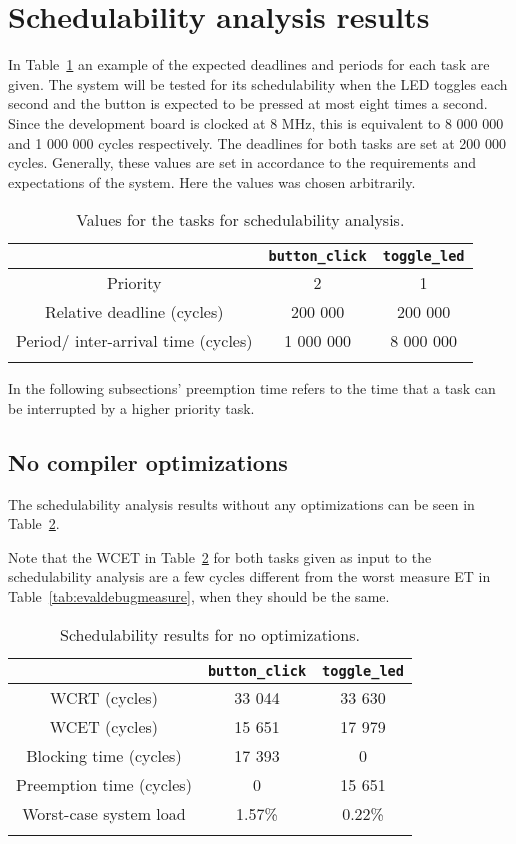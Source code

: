 \section{Schedulability analysis results}
In Table~\ref{tab:evalschedtasks} an example of the expected deadlines and
periods for each task are given. The system will be tested for its
schedulability when the LED toggles each second and the button is expected to
be pressed at most eight times a second. Since the development board is clocked
at 8 MHz, this is equivalent to 8 000 000 and 1 000 000 cycles respectively. The
deadlines for both tasks are set at 200 000 cycles. Generally, these values are set
in accordance to the requirements and expectations of the system. Here the values
was chosen arbitrarily.

\begin{longtable}{|c | c | c|}
    \hline
     & \texttt{button\_click} & \texttt{toggle\_led} \\
    \hline
    Priority & 2 & 1 \\
    \hline
    Relative deadline (cycles) & 200 000 & 200 000 \\
    \hline
    Period/ inter-arrival time (cycles) & 1 000 000 & 8 000 000 \\
    \hline
\caption{Values for the tasks for schedulability analysis.}
\label{tab:evalschedtasks}
\end{longtable}

In the following subsections' preemption time refers to the time that
a task can be interrupted by a higher priority task.

\subsection{No compiler optimizations}
The schedulability analysis results without any optimizations can be seen in
Table~\ref{tab:evalscheddebug}.

Note that the WCET in Table~\ref{tab:evalscheddebug} for both tasks given as input
to the schedulability analysis are a few cycles different from the worst measure
ET in Table~\ref{tab:evaldebugmeasure}, when they should be the same.

\begin{longtable}{|c | c | c|}
    \hline
     & \texttt{button\_click} & \texttt{toggle\_led} \\
    \hline
    WCRT (cycles) & 33 044 & 33 630 \\
    \hline
    WCET (cycles) & 15 651 & 17 979 \\
    \hline
    Blocking time (cycles) & 17 393 & 0 \\
    \hline
    Preemption time (cycles) & 0 & 15 651 \\
    \hline
    Worst-case system load & 1.57\% & 0.22\% \\
    \hline
\caption{Schedulability results for no optimizations.}
\label{tab:evalscheddebug}
\end{longtable}

